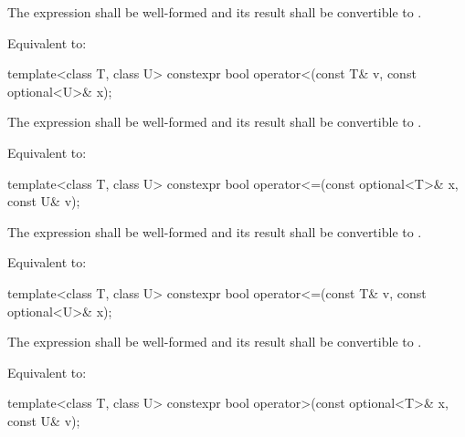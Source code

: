 \begin{itemdescr}
\pnum
\requires
The expression  shall be well-formed and
its result shall be convertible to .

\pnum
\effects
Equivalent to: 
\end{itemdescr}

%
\begin{itemdecl}
template<class T, class U> constexpr bool operator<(const T& v, const optional<U>& x);
\end{itemdecl}

\begin{itemdescr}
\pnum
\requires
The expression  shall be well-formed and
its result shall be convertible to .

\pnum
\effects
Equivalent to: 
\end{itemdescr}

%
\begin{itemdecl}
template<class T, class U> constexpr bool operator<=(const optional<T>& x, const U& v);
\end{itemdecl}

\begin{itemdescr}
\pnum
\requires
The expression  shall be well-formed and
its result shall be convertible to .

\pnum
\effects
Equivalent to: 
\end{itemdescr}

%
\begin{itemdecl}
template<class T, class U> constexpr bool operator<=(const T& v, const optional<U>& x);
\end{itemdecl}

\begin{itemdescr}
\pnum
\requires
The expression  shall be well-formed and
its result shall be convertible to .

\pnum
\effects
Equivalent to: 
\end{itemdescr}

%
\begin{itemdecl}
template<class T, class U> constexpr bool operator>(const optional<T>& x, const U& v);
\end{itemdecl}

